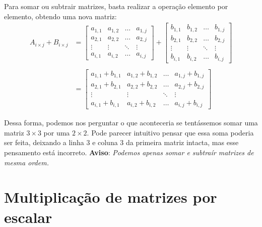 \documentclass[
  letterpaper,
  DIV=11,
  numbers=noendperiod]{scrreprt}
\begin{document}
Para somar ou subtrair matrizes, basta realizar a operação elemento por
elemento, obtendo uma nova matriz: \[
\begin{aligned}
    A_{i\times j}+B_{i\times j}&=
    \begin{bmatrix}
        a_{1,1} & a_{1,2} & \dots & a_{1,j} \\
        a_{2,1} & a_{2,2} & \dots & a_{2,j} \\
        \vdots  & \vdots & \ddots & \vdots \\
        a_{i,1} & a_{i,2} & \dots & a_{i,j}
    \end{bmatrix}
    +
    \begin{bmatrix}
        b_{1,1} & b_{1,2} & \dots & b_{1,j} \\
        b_{2,1} & b_{2,2} & \dots & b_{2,j} \\
        \vdots  & \vdots & \ddots & \vdots \\
        b_{i,1} & b_{i,2} & \dots & b_{i,j}
    \end{bmatrix}\\ \\
    &=
    \begin{bmatrix}
        a_{1,1} + b_{1,1} & a_{1,2} + b_{1,2} & \dots & a_{1,j} + b_{1,j} \\
        a_{2,1} + b_{2,1} & a_{2,2} + b_{2,2} & \dots & a_{2,j} + b_{2,j} \\
        \vdots  & \vdots & \ddots & \vdots \\
        a_{i,1} + b_{i,1} & a_{i,2} + b_{i,2} & \dots & a_{i,j} + b_{i,j}
    \end{bmatrix}
\end{aligned}
\]

Dessa forma, podemos nos perguntar o que aconteceria se tentássemos
somar uma matriz \(3\times 3\) por uma \(2 \times 2\). Pode parecer
intuitivo pensar que essa soma poderia ser feita, deixando a linha 3 e
coluna 3 da primeira matriz intacta, mas esse pensamento está incorreto.
\textbf{Aviso}: \emph{Podemos apenas somar e subtraír matrizes de mesma
ordem.}

\section{Multiplicação de matrizes por
escalar}\label{multiplicauxe7uxe3o-de-matrizes-por-escalar}
\end{document}
